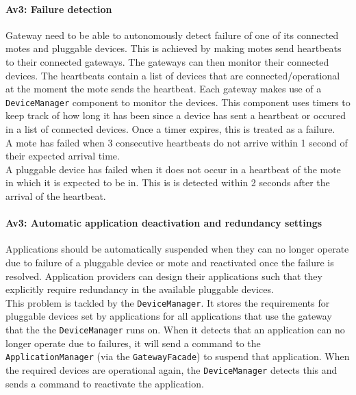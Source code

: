     \paragraph{Av3: Failure detection}
        Gateway need to be able to autonomously detect failure of one of its
        connected motes and pluggable devices. This is achieved by making motes
        send heartbeats to their connected gateways. The gateways can
        then monitor their connected devices. The heartbeats contain a list
        of devices that are connected/operational at the moment the mote sends
        the heartbeat. Each gateway makes use of a \texttt{DeviceManager}
        component to monitor the devices. This component uses timers to keep track
        of how long it has been since a device has sent a heartbeat or occured in
        a list of connected devices. Once a timer expires, this is treated as
        a failure. \\

        A mote has failed when 3 consecutive heartbeats do not arrive within 1
        second of their expected arrival time. \\
        A pluggable device has failed when it does not occur in a heartbeat of the
        mote in which it is expected to be in. This is is detected within 2
        seconds after the arrival of the heartbeat.

    \paragraph{Av3: Automatic application deactivation and redundancy settings}
        Applications should be automatically suspended when they can no longer
        operate due to failure of a pluggable device or mote and reactivated
        once the failure is resolved. Application providers can design their
        applications such that they explicitly require redundancy in
        the available pluggable devices. \\
        This problem is tackled by the \texttt{DeviceManager}. It
        stores the requirements for pluggable devices set by applications for all
        applications that use the gateway that the the \texttt{DeviceManager}
        runs on. When it detects that an application can no longer operate
        due to failures, it will send a command to the \texttt{ApplicationManager}
        (via the \texttt{GatewayFacade})
        to suspend that application. When the required devices are operational
        again, the \texttt{DeviceManager} detects this and sends a
        command to reactivate the application. \\


